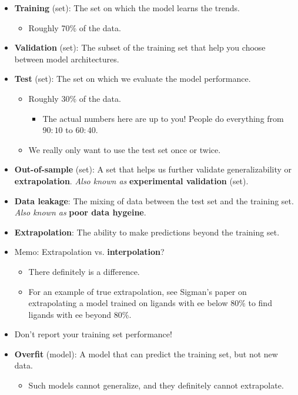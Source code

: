 \documentclass[../notes.tex]{subfiles}
\begin{document}
\begin{itemize}
    \item \textbf{Training} (set): The set on which the model learns the trends.
    \begin{itemize}
        \item Roughly 70\% of the data.
    \end{itemize}
    \item \textbf{Validation} (set): The subset of the training set that help you choose between model architectures.
    \item \textbf{Test} (set): The set on which we evaluate the model performance.
    \begin{itemize}
        \item Roughly 30\% of the data.
        \begin{itemize}
            \item The actual numbers here are up to you! People do everything from $90:10$ to $60:40$.
        \end{itemize}
        \item We really only want to use the test set once or twice.
    \end{itemize}
    \item \textbf{Out-of-sample} (set): A set that helps us further validate generalizability or \textbf{extrapolation}. \emph{Also known as} \textbf{experimental validation} (set).
    \item \textbf{Data leakage}: The mixing of data between the test set and the training set. \emph{Also known as} \textbf{poor data hygeine}.
    \item \textbf{Extrapolation}: The ability to make predictions beyond the training set.
    \item Memo: Extrapolation vs. \textbf{interpolation}?
    \begin{itemize}
        \item There definitely is a difference.
        \item For an example of true extrapolation, see Sigman's paper on extrapolating a model trained on ligands with ee below 80\% to find ligands with ee beyond 80\%.
    \end{itemize}
    \item Don't report your training set performance!
    \item \textbf{Overfit} (model): A model that can predict the training set, but not new data.
    \begin{itemize}
        \item Such models cannot generalize, and they definitely cannot extrapolate.

\end{itemize}
\end{itemize}
\end{document}
